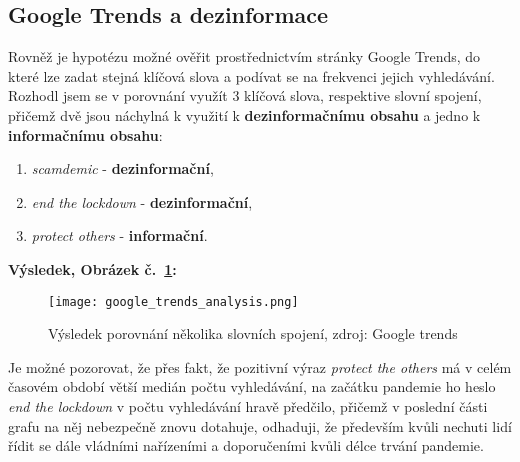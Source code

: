 

\subsection{Google Trends a dezinformace}

Rovněž je hypotézu možné ověřit prostřednictvím stránky Google Trends, do které lze zadat stejná klíčová slova a podívat se na frekvenci jejich vyhledávání.\\

Rozhodl jsem se v porovnání využít 3 klíčová slova, respektive slovní spojení, přičemž dvě jsou náchylná k využití k \textbf{dezinformačnímu obsahu} a jedno k \textbf{informačnímu obsahu}:\\

\begin{enumerate}
\item \textit{scamdemic} - \textbf{dezinformační},
\item \textit{end the lockdown} - \textbf{dezinformační},
\item \textit{protect others} - \textbf{informační}.	
\end{enumerate}
\vspace*{5mm}

\textbf{Výsledek, Obrázek č.~\ref{fig:google trends}:}

\begin{figure}[htbp]
  \centering
  \texttt{[image: google\_trends\_analysis.png]}
  \caption{Výsledek porovnání několika slovních spojení, zdroj: Google trends}
  \label{fig:google trends}
\end{figure}

Je možné pozorovat, že přes fakt, že pozitivní výraz \textit{protect the others} má v celém časovém období větší medián počtu vyhledávání, na začátku pandemie ho heslo \textit{end the lockdown} v počtu vyhledávání hravě předčilo, přičemž v poslední části grafu na něj nebezpečně znovu dotahuje, odhaduji, že především kvůli nechuti lidí řídit se dále vládními nařízeními a doporučeními kvůli délce trvání pandemie.\\

\newpage


